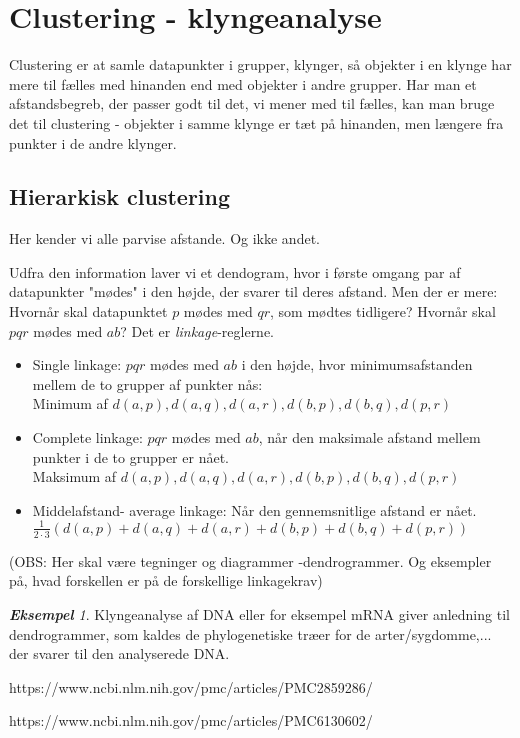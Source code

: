 \documentclass[a4paper, 12pt]{article}
\theoremstyle{remark}
\newtheorem{Eksempel}{\textbf{Eksempel}}
\begin{document}
\section*{Clustering - klyngeanalyse}

Clustering er at samle datapunkter i grupper, klynger, så objekter i en klynge har mere til fælles med hinanden end med objekter i andre grupper. Har man et afstandsbegreb, der passer godt til det, vi mener med til fælles, kan man bruge det til clustering - objekter i samme klynge er tæt på hinanden, men længere fra punkter i de andre klynger. 
\subsection*{Hierarkisk clustering}
Her kender vi alle parvise afstande. Og ikke andet. 

Udfra den information laver vi et dendogram, hvor i første omgang par af datapunkter "mødes"\; i den højde, der svarer til deres afstand. Men der er mere: Hvornår skal datapunktet $p$ mødes med $qr$, som mødtes tidligere? Hvornår skal $pqr$ mødes med $ab$?  Det er \emph{linkage}-reglerne.
\begin{itemize}
\item Single linkage: $pqr$ mødes med $ab$ i den højde, hvor minimumsafstanden mellem de to grupper af punkter nås:\\ Minimum af $d(a,p),d(a,q), d(a,r), d(b,p), d(b,q), d(p,r)$
\item Complete linkage: $pqr$ mødes med $ab$, når den maksimale afstand mellem punkter i de to grupper er nået. \\Maksimum af $d(a,p),d(a,q), d(a,r), d(b,p), d(b,q), d(p,r)$
\item Middelafstand- average linkage: Når den gennemsnitlige afstand er nået. $\frac{1}{2\cdot 3}(d(a,p)+d(a,q)+ d(a,r)+ d(b,p)+ d(b,q)+ d(p,r))$
\end{itemize}
(OBS: Her skal være tegninger og diagrammer -dendrogrammer. Og eksempler på, hvad forskellen er på de forskellige linkagekrav)

\begin{Eksempel} Klyngeanalyse af DNA eller for eksempel mRNA giver anledning til dendrogrammer, som kaldes de phylogenetiske træer for de arter/sygdomme,... der svarer til den analyserede DNA. 

https://www.ncbi.nlm.nih.gov/pmc/articles/PMC2859286/

https://www.ncbi.nlm.nih.gov/pmc/articles/PMC6130602/
\end{Eksempel}
\end{document}
